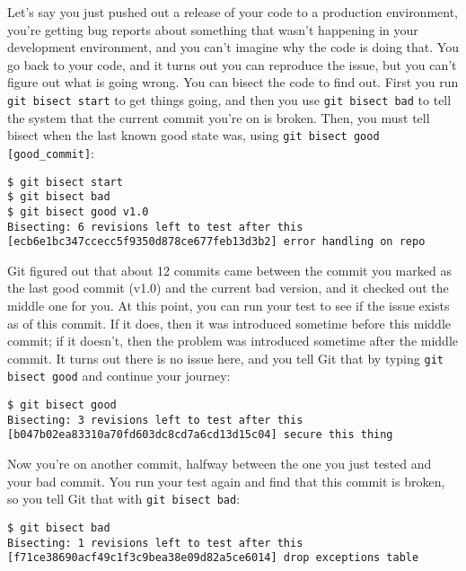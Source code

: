 \documentclass[a4paper]{book}
\newcounter{tab}[chapter]
\begin{document}
Let's say you just pushed out a release of your code to a production environment, you're getting bug reports about something that wasn't happening in your development environment, and you can't imagine why the code is doing that. You go back to your code, and it turns out you can reproduce the issue, but you can't figure out what is going wrong. You can bisect the code to find out. First you run \texttt{git bisect start} to get things going, and then you use \texttt{git bisect bad} to tell the system that the current commit you're on is broken. Then, you must tell bisect when the last known good state was, using \texttt{git bisect good {[}good\_commit{]}}:

\begin{shaded}\begin{verbatim}
$ git bisect start
$ git bisect bad
$ git bisect good v1.0
Bisecting: 6 revisions left to test after this
[ecb6e1bc347ccecc5f9350d878ce677feb13d3b2] error handling on repo
\end{verbatim}\end{shaded}

Git figured out that about 12 commits came between the commit you marked as the last good commit (v1.0) and the current bad version, and it checked out the middle one for you. At this point, you can run your test to see if the issue exists as of this commit. If it does, then it was introduced sometime before this middle commit; if it doesn't, then the problem was introduced sometime after the middle commit. It turns out there is no issue here, and you tell Git that by typing \texttt{git bisect good} and continue your journey:

\begin{shaded}\begin{verbatim}
$ git bisect good
Bisecting: 3 revisions left to test after this
[b047b02ea83310a70fd603dc8cd7a6cd13d15c04] secure this thing
\end{verbatim}\end{shaded}

Now you're on another commit, halfway between the one you just tested and your bad commit. You run your test again and find that this commit is broken, so you tell Git that with \texttt{git bisect bad}:

\begin{shaded}\begin{verbatim}
$ git bisect bad
Bisecting: 1 revisions left to test after this
[f71ce38690acf49c1f3c9bea38e09d82a5ce6014] drop exceptions table
\end{verbatim}\end{shaded}
\end{document}
